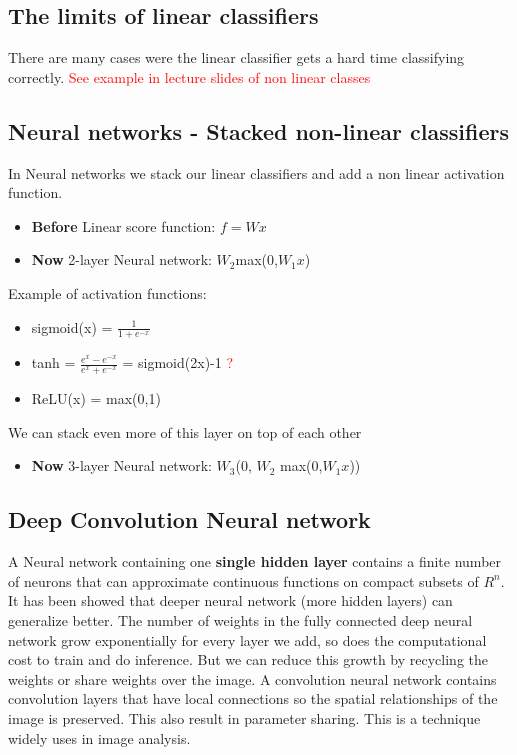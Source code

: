 \subsection*{The limits of linear classifiers}


There are many cases were the linear classifier gets a hard time classifying correctly. \textcolor{red}{See example in lecture slides of non linear classes} 


\subsection*{Neural networks - Stacked non-linear classifiers}
In Neural networks we stack our linear classifiers and add a non linear activation function. 

\begin{itemize}
	\item \textbf{Before} Linear score function: $f = Wx$
	\item \textbf{Now} 2-layer Neural network: $W_2$max(0,$W_1 x$)
\end{itemize}

Example of activation functions:

\begin{itemize}
	\item sigmoid(x) = $\frac{1} {1+e^{-x}}$
	\item tanh = $\frac{e^{x}-e^{-x}} {e^{x}+e^{-x}}$ = sigmoid(2x)-1 \textcolor{red}{?} 
	\item ReLU(x) = max(0,1)
\end{itemize}

We can stack even more of this layer on top of each other 

\begin{itemize}
	\item \textbf{Now} 3-layer Neural network: $W_3$(0, $W_2$ max(0,$W_1 x$))
\end{itemize}


\subsection*{Deep Convolution Neural network}

A Neural network containing one  \textbf{single hidden layer} contains a finite number of neurons that can approximate continuous functions on compact subsets of $R^{n}$. It has been showed that deeper neural network (more hidden layers) can generalize better. The number of weights in the fully connected deep neural network grow exponentially for every layer we add, so does the computational cost to train and do inference. But we can reduce this growth by recycling the weights or share weights over the image. A convolution neural network contains convolution layers that have local connections so the spatial relationships of the image is preserved. This also result in parameter sharing. This is a technique widely uses in image analysis. 

